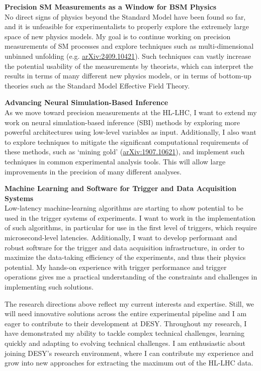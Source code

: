 \documentclass[11pt, a4paper]{awesome-cv}
\begin{document}
\begin{cvletter}
  \textbf{Precision SM Measurements as a Window for BSM Physics}\\
  No direct signs of physics beyond the Standard Model have been found so far, and it is unfeasible for experimentalists to properly explore the extremely large space of new physics models. My goal is to continue working on precision measurements of SM processes and explore techniques such as multi-dimensional unbinned unfolding (e.g. \href{https://arxiv.org/abs/2409.10421}{arXiv:2409.10421}). Such techniques can vastly increase the potential usability of the measurements by theorists, which can interpret the results in terms of many different new physics models, or in terms of bottom-up theories such as the Standard Model Effective Field Theory.

  \textbf{Advancing Neural Simulation-Based Inference}\\
  As we move toward precision measurements at the HL-LHC, I want to extend my work on neural simulation-based inference (SBI) methods by exploring more powerful architectures using low-level variables as input. Additionally, I also want to explore techniques to mitigate the significant computational requirements of these methods, such as `mining gold' (\href{https://arxiv.org/abs/1907.10621}{arXiv:1907.10621}), and implement such techniques in common experimental analysis tools. This will allow large improvements in the precision of many different analyses.
  
  \textbf{Machine Learning and Software for Trigger and Data Acquisition Systems}\\
  Low-latency machine-learning algorithms are starting to show potential to be used in the trigger systems of experiments. I want to work in the implementation of such algorithms, in particular for use in the first level of triggers, which require microsecond-level latencies. Additionally, I want to develop performant and robust software for the trigger and data acquisition infrastructure, in order to maximize the data-taking efficiency of the experiments, and thus their physics potential. My hands-on experience with trigger performance and trigger operations gives me a practical understanding of the constraints and challenges in implementing such solutions.

  The research directions above reflect my current interests and expertise. Still, we will need innovative solutions across the entire experimental pipeline and I am eager to contribute to their development at DESY. Throughout my research, I have demonstrated my ability to tackle complex technical challenges, learning quickly and adapting to evolving technical challenges. I am enthusiastic about joining DESY's research environment, where I can contribute my experience and grow into new approaches for extracting the maximum out of the HL-LHC data.

\end{cvletter}

\makeletterclosing
\end{document}

